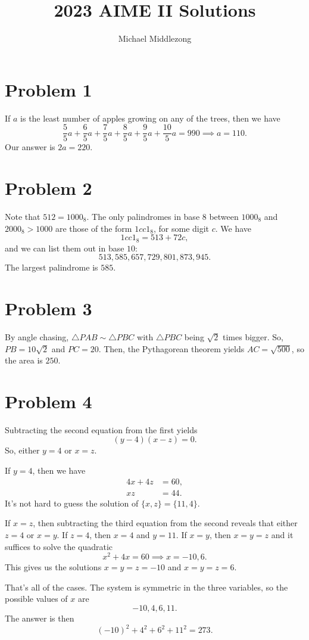 \documentclass{scrartcl}
\title{2023 AIME II Solutions}
\author{Michael Middlezong}
\begin{document}
\maketitle

\section*{Problem 1}
If $a$ is the least number of apples growing on any of the trees,
then we have
\[ \frac55 a + \frac65 a + \frac75 a + \frac85 a + \frac95 a + \frac{10}{5}a = 990 \implies a = 110. \]
Our answer is $2a = \boxed{220}$.
\section*{Problem 2}
Note that $512 = 1000_8$.
The only palindromes in base $8$ between $1000_8$ and $2000_8 > 1000$
are those of the form $1cc1_8$, for some digit $c$.
We have
\[ 1cc1_8 = 513 + 72c, \]
and we can list them out in base $10$:
\[ 513, 585, 657, 729, 801, 873, 945. \]
The largest palindrome is $\boxed{585}$.
\section*{Problem 3}
By angle chasing, $\triangle PAB \sim \triangle PBC$ with $\triangle PBC$ being $\sqrt2$ times bigger.
So, $PB = 10\sqrt2$ and $PC = 20$.
Then, the Pythagorean theorem yields $AC = \sqrt{500}$, so the area is $\boxed{250}$.

\section*{Problem 4}
Subtracting the second equation from the first yields
\[ (y-4)(x-z) = 0. \]
So, either $y=4$ or $x=z$.

If $y=4$, then we have
\begin{align*}
4x + 4z &= 60, \\
xz &= 44.
\end{align*}
It's not hard to guess the solution of $\{x,z\} = \{11,4\}$.

If $x=z$, then subtracting the third equation from the second reveals
that either $z=4$ or $x=y$.
If $z=4$, then $x=4$ and $y=11$.
If $x=y$, then $x=y=z$ and it suffices to solve the quadratic
\[ x^2 + 4x = 60 \implies x = -10, 6. \]
This gives us the solutions $x=y=z=-10$ and $x=y=z=6$.

That's all of the cases.
The system is symmetric in the three variables,
so the possible values of $x$ are
\[ -10, 4, 6, 11. \]
The answer is then
\[ (-10)^2 + 4^2 + 6^2 + 11^2 = \boxed{273}. \]
\end{document}
